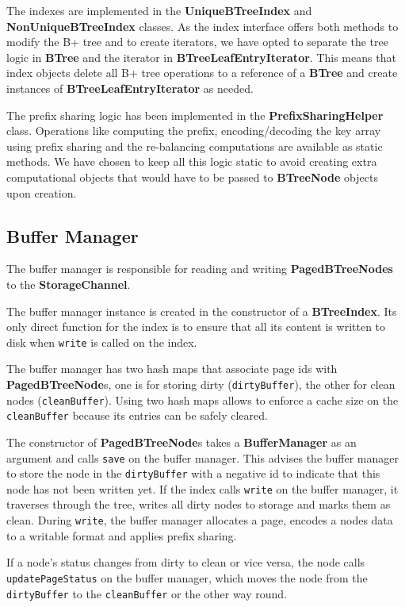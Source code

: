 \documentclass[11pt,a4paper,oneside]{article}
\begin{document}
The indexes are implemented in the \textbf{UniqueBTreeIndex} and \textbf{NonUniqueBTreeIndex} classes. As the index interface offers both methods to modify the B+ tree and to create iterators, we have opted to separate the tree logic in \textbf{BTree} and the iterator in \textbf{BTreeLeafEntryIterator}. This means that index objects delete all B+ tree operations to a reference of a \textbf{BTree} and create instances of \textbf{BTreeLeafEntryIterator} as needed.

The prefix sharing logic has been implemented in the \textbf{PrefixSharingHelper} class. Operations like computing the prefix, encoding/decoding the key array using prefix sharing and the re-balancing computations are available as static methods. We have chosen to keep all this logic static to avoid creating extra computational objects that would have to be passed to \textbf{BTreeNode} objects upon creation.

\subsection{Buffer Manager} %
\label{sub:buffer_manager}
The buffer manager is responsible for reading and writing \textbf{PagedBTreeNodes} to the \textbf{StorageChannel}.

The buffer manager instance is created in the constructor of a \textbf{BTreeIndex}. 
Its only direct function for the index is to ensure that all its content is written to disk when \texttt{write} is called on the index.

The buffer manager has two hash maps that associate page ids with \textbf{PagedBTreeNode}s, one is for storing dirty (\texttt{dirtyBuffer}), 
the other for clean nodes (\texttt{cleanBuffer}). 
Using two hash maps allows to enforce a cache size on the \texttt{cleanBuffer} because its entries can be safely cleared.

The constructor of \textbf{PagedBTreeNode}s takes a \textbf{BufferManager} as an argument and calls \texttt{save} on the buffer manager.
This advises the buffer manager to store the node in the \texttt{dirtyBuffer} with a negative id to indicate that this node has not been written yet.
If the index calls \texttt{write} on the buffer manager, it traverses through the tree, writes all dirty nodes to storage and marks them as clean.
During \texttt{write}, the buffer manager allocates a page, encodes a nodes data to a writable format and applies prefix sharing.

If a node's status changes from dirty to clean or vice versa, the node calls \texttt{updatePageStatus} on the buffer manager, 
which moves the node from the \texttt{dirtyBuffer} to the \texttt{cleanBuffer} or the other way round.
\end{document}
